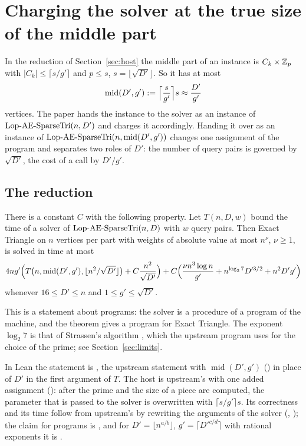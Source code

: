 \section{Charging the solver at the true size of the middle part}
\label{sec:middle}

In the reduction of Section~\ref{sec:host} the middle part of an instance is
\(C_k\times\mathbb{Z}_p\) with \(|C_k|\le\lceil s/g'\rceil\) and \(p\le s\),
\(s=\lfloor\sqrt{D'}\rfloor\).  So it has at most
\[
  \operatorname{mid}(D',g'):=\Bigl\lceil\frac{s}{g'}\Bigr\rceil s\approx\frac{D'}{g'}
\]
vertices.  The paper hands the instance to the solver as an instance of
\(\textup{Lop-AE-SparseTri}(n,D')\) and charges it accordingly.  Handing it over as an instance
of \(\textup{Lop-AE-SparseTri}(n,\operatorname{mid}(D',g'))\) changes one assignment of the
program and separates two roles of \(D'\): the number of query pairs is
governed by \(\sqrt{D'}\), the cost of a call by \(D'/g'\).

\subsection{The reduction}

\begin{theorem}\label{thm:mid}
There is a constant \(C\) with the following property.  Let \(T(n,D,w)\) bound
the time of a solver of \(\textup{Lop-AE-SparseTri}(n,D)\) with \(w\) query pairs.  Then Exact
Triangle on \(n\) vertices per part with weights of absolute value at most
\(n^{\nu}\), \(\nu\ge1\), is solved in time at most
\[
  4ng'\Bigl(T\bigl(n,\operatorname{mid}(D',g'),\lfloor n^{2}/\sqrt{D'}\rfloor\bigr)
     +C\frac{n^{2}}{\sqrt{D'}}\Bigr)
  +C\Bigl(\frac{\nu n^{3}\log n}{g'}+n^{\log_2 7}D'^{3/2}+n^{2}D'g'\Bigr)
\]
whenever \(16\le D'\le n\) and \(1\le g'\le\sqrt{D'}\).
\end{theorem}

This is a statement about programs: the solver is a procedure of a program of
the machine, and the theorem gives a program for Exact Triangle.  The exponent
\(\log_2 7\) is that of Strassen's algorithm \cite{Str69}, which the upstream
program uses for the choice of the prime; see Section~\ref{sec:limits}.

In Lean the statement is , the upstream statement
 with \(\operatorname{mid}(D',g')\) () in
place of \(D'\) in the first argument of \(T\).  The host is upstream's with one
added assignment (): after the prime and the size of a piece
are computed, the parameter that is passed to the solver is overwritten with
\(\lceil s/g'\rceil s\).  Its correctness and its time follow from upstream's by
rewriting the arguments of the solver (,
); the claim for programs is
, and for \(D'=\lfloor n^{a/b}\rfloor\),
\(g'=\lceil D'^{c/d}\rceil\) with rational exponents it is
.

